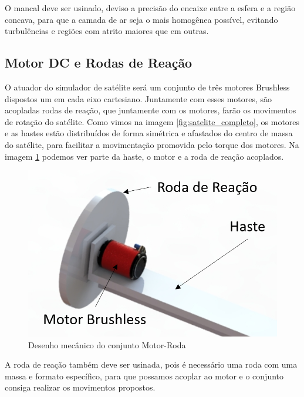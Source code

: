 O mancal deve ser usinado, deviso a precisão do encaixe entre a esfera e a região concava, para que a camada de ar seja o mais homogênea possível, evitando turbulências e regiões com atrito maiores que em outras. 

\subsection{Motor DC e Rodas de Reação}

O atuador do simulador de satélite será um conjunto de três motores Brushless dispostos um em cada eixo cartesiano. Juntamente com esses motores, são acopladas rodas de reação, que juntamente com os motores, farão os movimentos de rotação do satélite. Como vimos na imagem \ref{fig:satelite_completo}, os motores e as hastes estão distribuídos de forma simétrica e afastados do centro de massa do satélite, para facilitar a movimentação promovida pelo torque dos motores. Na imagem \ref{fig:motor_roda_desenho} podemos ver parte da haste, o motor e a roda de reação acoplados.

\begin{figure}[H]
  \caption{Desenho mecânico do conjunto Motor-Roda}
  \begin{center}
      \includegraphics[scale=.45]{metodologia/img/motor_roda_desenho}
  \end{center}
  \label{fig:motor_roda_desenho}
\end{figure}

A roda de reação também deve ser usinada, pois é necessário uma roda com uma massa e formato específico, para que possamos acoplar ao motor e o conjunto consiga realizar os movimentos propostos. 

